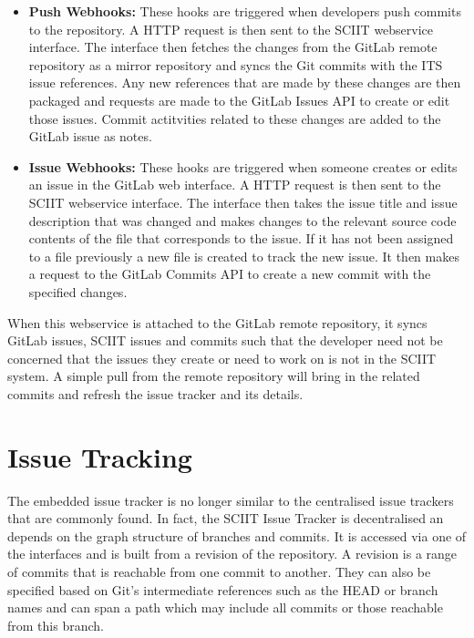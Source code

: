 \documentclass{mproj}
\begin{document}
\begin{itemize}
  \item \textbf{Push Webhooks:} These hooks are triggered when developers push commits to the repository. A HTTP request is then sent to the SCIIT webservice interface. The interface then fetches the changes from the GitLab remote repository as a mirror repository and syncs the Git commits with the ITS issue references. Any new references that are made by these changes are then packaged and requests are made to the GitLab Issues API to create or edit those issues. Commit actitvities related to these changes are added to the GitLab issue as notes.
  \item \textbf{Issue Webhooks:} These hooks are triggered when someone creates or edits an issue in the GitLab web interface. A HTTP request is then sent to the SCIIT webservice interface. The interface then takes the issue title and issue description that was changed and makes changes to the relevant source code contents of the file that corresponds to the issue. If it has not been assigned to a file previously a new file is created to track the new issue. It then makes a request to the GitLab Commits API to create a new commit with the specified changes.
\end{itemize}

When this webservice is attached to the GitLab remote repository, it syncs GitLab issues, SCIIT issues and commits such that the developer need not be concerned that the issues they create or need to work on is not in the SCIIT system. A simple pull from the remote repository will bring in the related commits and refresh the issue tracker and its details.




\section{Issue Tracking}

The embedded issue tracker is no longer similar to the centralised issue trackers that are commonly found. In fact, the SCIIT Issue Tracker is decentralised an depends on the graph structure of branches and commits. It is accessed via one of the interfaces and is built from a revision of the repository. A revision is a range of commits that is reachable from one commit to another. They can also be specified based on Git's intermediate references such as the HEAD or branch names and can span a path which may include all commits or those reachable from this branch.
\end{document}
